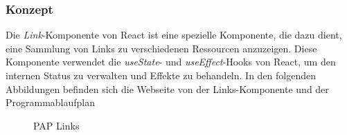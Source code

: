 \subsubsection{Konzept}
Die \emph{Link}-Komponente von React ist eine spezielle Komponente, die dazu dient, eine Sammlung von Links zu verschiedenen Ressourcen anzuzeigen. Diese Komponente verwendet die \emph{useState}- und \emph{useEffect}-Hooks von React, um den internen Status zu verwalten und Effekte zu behandeln.
In den folgenden Abbildungen befinden sich die Webseite von der Links-Komponente und der Programmablaufplan
\begin{figure}[htbp]
	\centering
	\caption{PAP Links}
\end{figure}
